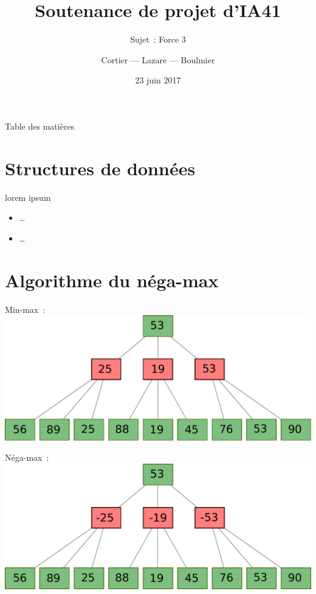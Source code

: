 \documentclass[11pt]{beamer}
\author{Cortier — Lazare — Boulmier}
\institute[]{UTBM}
\title{Soutenance de projet d'IA41}
\subtitle{Sujet : Force 3}
\date{23 juin 2017}
\begin{document}
\begin{frame}
    \titlepage{}
\end{frame}

\begin{frame}{Table des matières}
    \tableofcontents
\end{frame}

\section{Structures de données}

\begin{frame}
    \begin{block}{lorem ipsum}
            \begin{itemize}
                \item …
                \item …
            \end{itemize}
    \end{block}
\end{frame}

\section{Algorithme du néga-max}

\begin{frame}
    Min-max :
    \includegraphics[width=\linewidth]{minmax}
\end{frame}

\begin{frame}
    Néga-max :
    \includegraphics[width=\linewidth]{negamax}
\end{frame}
\end{document}
